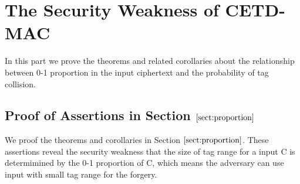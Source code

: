 \documentclass{article}
\begin{document}
%





\appendix
\section{The Security Weakness of CETD-MAC}
In this part we prove the theorems and related corollaries about the relationship between 0-1 proportion in the input ciphertext and the probability of tag collision.
\subsection{Proof of Assertions in Section $\ref{sect:proportion}$}
We proof the theorems and corollaries in Section $\ref{sect:proportion}$. These assertions reveal the security weakness that the size of tag range for a input C is determimined by the 0-1 proportion of C, which means the adversary can use input with small tag range for the forgery. 
\end{document}
